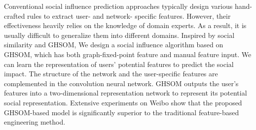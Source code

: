Conventional social influence prediction approaches typically design various hand-crafted rules to extract user- and network- specific features. However, their effectiveness heavily relies on the knowledge of domain experts. As a result, it is usually difficult to generalize them into different domains. Inspired by social similarity and GHSOM, We design a social influence algorithm based on GHSOM, which has both graph-fixed-point feature and manual feature input. We can learn the representation of users' potential features to predict the social impact. The structure of the network and the user-specific features are complemented in the convolution neural network. GHSOM outputs the user's features into a two-dimensional representation network to represent its potential social representation. Extensive experiments on Weibo show that the proposed GHSOM-based model is significantly superior to the traditional feature-based engineering method.


